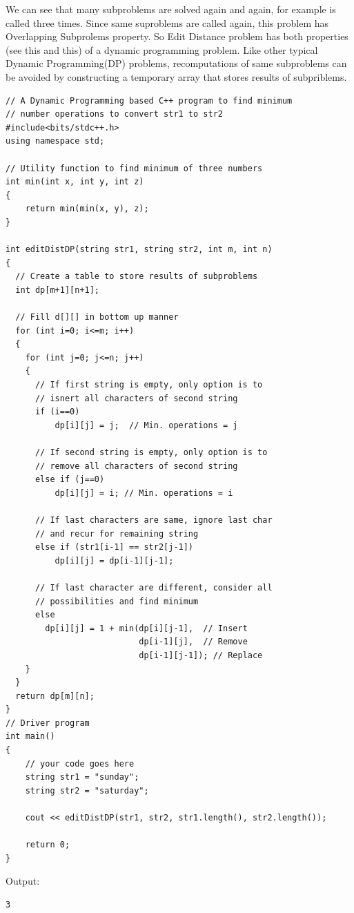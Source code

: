 We can see that many subproblems are solved again and again, for example
 is called three times. Since same suproblems are called again,
this problem has Overlapping Subprolems property. So Edit Distance problem
has both properties (see this and this) of a dynamic programming problem.
Like other typical Dynamic Programming(DP) problems, recomputations of same
subproblems can be avoided by constructing a temporary array that stores
results of subpriblems.
\begin{lstlisting}[style=raycppnewsnippet]
// A Dynamic Programming based C++ program to find minimum
// number operations to convert str1 to str2
#include<bits/stdc++.h>
using namespace std;
 
// Utility function to find minimum of three numbers
int min(int x, int y, int z)
{
    return min(min(x, y), z);
}

int editDistDP(string str1, string str2, int m, int n)
{
  // Create a table to store results of subproblems
  int dp[m+1][n+1];
 
  // Fill d[][] in bottom up manner
  for (int i=0; i<=m; i++)
  {
    for (int j=0; j<=n; j++)
    {
      // If first string is empty, only option is to
      // isnert all characters of second string
      if (i==0)
          dp[i][j] = j;  // Min. operations = j
 
      // If second string is empty, only option is to
      // remove all characters of second string
      else if (j==0)
          dp[i][j] = i; // Min. operations = i
 
      // If last characters are same, ignore last char
      // and recur for remaining string
      else if (str1[i-1] == str2[j-1])
          dp[i][j] = dp[i-1][j-1];
 
      // If last character are different, consider all
      // possibilities and find minimum
      else
        dp[i][j] = 1 + min(dp[i][j-1],  // Insert
                           dp[i-1][j],  // Remove
                           dp[i-1][j-1]); // Replace
    }
  }
  return dp[m][n];
}
// Driver program
int main()
{
    // your code goes here
    string str1 = "sunday";
    string str2 = "saturday";
 
    cout << editDistDP(str1, str2, str1.length(), str2.length());
 
    return 0;
}
\end{lstlisting}
Output:
\begin{lstlisting}[style=rayio]
3
\end{lstlisting}

